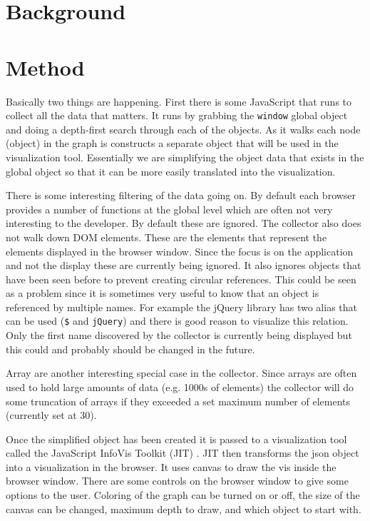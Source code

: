 \documentclass[]{article}
\begin{document}
\section{Background}
\label{sec:background}


\section{Method}
\label{sec:method}
Basically two things are happening. First there is some JavaScript that runs to collect all the data that matters. It runs by grabbing the {\tt window} global object and doing a depth-first search through each of the objects. As it walks each node (object) in the graph is constructs a separate object that will be used in the visualization tool. Essentially we are simplifying the object data that exists in the global object so that it can be more easily translated into the visualization.

There is some interesting filtering of the data going on. By default each browser provides a number of functions at the global level which are often not very interesting to the developer. By default these are ignored. The collector also does not walk down DOM elements. These are the elements that represent the elements displayed in the browser window. Since the focus is on the application and not the display these are currently being ignored. It also ignores objects that have been seen before to prevent creating circular references. This could be seen as a problem since it is sometimes very useful to know that an object is referenced by multiple names. For example the jQuery library has two alias that can be used ({\tt \$} and {\tt jQuery}) and there is good reason to visualize this relation. Only the first name discovered by the collector is currently being displayed but this could and probably should be changed in the future.

Array are another interesting special case in the collector. Since arrays are often used to hold large amounts of data (e.g. 1000s of elements) the collector will do some truncation of arrays if they exceeded a set maximum number of elements (currently set at 30).

Once the simplified object has been created it is passed to a visualization tool called the JavaScript InfoVis Toolkit (JIT) \cite{jit}. JIT then transforms the json object into a visualization in the browser. It uses canvas to draw the vis inside the browser window. There are some controls on the browser window to give some options to the user. Coloring of the graph can be turned on or off, the size of the canvas can be changed, maximum depth to draw, and which object to start with.
\end{document}
